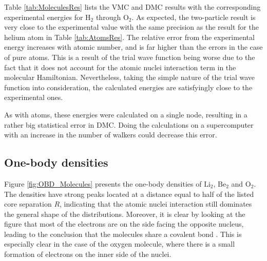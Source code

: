Table \ref{tab:MoleculesRes} lists the VMC and DMC results with the corresponding experimental energies for $\mathrm{H_2}$ through $\mathrm{O_2}$. As expected, the two-particle result is very close to the experimental value with the same precision as the result for the helium atom in Table \ref{tab:AtomsRes}. The relative error from the experimental energy increases with atomic number, and is far higher than the errors in the case of pure atoms. This is a result of the trial wave function being worse due to the fact that it does not account for the atomic nuclei interaction term in the molecular Hamiltonian. Nevertheless, taking the simple nature of the trial wave function into consideration, the calculated energies are satisfyingly close to the experimental ones. 

As with atoms, these energies were calculated on a single node, resulting in a rather big statistical error in DMC. Doing the calculations on a supercomputer with an increase in the number of walkers could decrease this error.

\subsection{One-body densities}

Figure \ref{fig:OBD_Molecules} presents the one-body densities of $\mathrm{Li_2}$, $\mathrm{Be_2}$ and $\mathrm{O_2}$. The densities have strong peaks located at a distance equal to half of the listed core separation $R$, indicating that the atomic nuclei interaction still dominates the general shape of the distributions. Moreover, it is clear by looking at the figure that most of the electrons are on the side facing the opposite nucleus, leading to the conclusion that the molecules share a covalent bond \cite{UniversityPhysics}. This is especially clear in the case of the oxygen molecule, where there is a small formation of electrons on the inner side of the nuclei.

